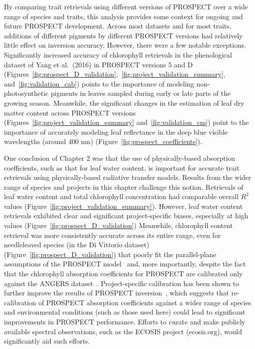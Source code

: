 By comparing trait retrievals using different versions of PROSPECT over a wide range of species and traits, this analysis provides some context for ongoing and future PROSPECT development.
Across most datasets and for most traits, additions of different pigments by different PROSPECT versions had relatively little effect on inversion accuracy.
However, there were a few notable exceptions.
Significantly increased accuracy of chlorophyll retrievals in the phenological dataset of Yang et al.~(2016) \nocite{yang_2016_seasonal} in PROSPECT versions 5 and D (Figures~\ref{fig:prospect_D_validation},~\ref{fig:project_validation_summary}, and~\ref{fig:validation_cab}) points to the importance of modeling non-photosynthetic pigments in leaves sampled during early or late parts of the growing season.
Meanwhile, the significant changes in the estimation of leaf dry matter content across PROSPECT versions (Figures~\ref{fig:project_validation_summary} and~\ref{fig:validation_cm}) point to the importance of accurately modeling leaf reflectance in the deep blue visible wavelengths (around 400 nm) (Figure~\ref{fig:prospect_coefficients}).

One conclusion of Chapter 2 was that the use of physically-based absorption coefficients, such as that for leaf water content, is important for accurate trait retrievals using physically-based radiative transfer models.
Results from the wider range of species and projects in this chapter challenge this notion.
Retrievals of leaf water content and total chlorophyll concentration had comparable overall $R^2$ values (Figure~\ref{fig:project_validation_summary}).
However, leaf water content retrievals exhibited clear and significant project-specific biases, especially at high values (Figure~\ref{fig:prospect_D_validation})
Meanwhile, chlorophyll content retrieval was more consistently accurate across its entire range, even for needleleaved species (in the Di Vittorio dataset) (Figure~\ref{fig:prospect_D_validation}) that poorly fit the parallel-plane assumptions of the PROSPECT model~\cite{allen_1969_interaction,jacquemoud1990_prospect} and, more importantly, despite the fact that the chlorophyll absorption coefficients for PROSPECT are calibrated only against the ANGERS dataset~\cite{feret2008_prospect,feret2017_prospectd}.
Project-specific calibration has been shown to further improve the results of PROSPECT inversion~\cite{li_2013_retrieval}, which suggests that re-calibration of PROSPECT absorption coefficients against a wider range of species and environmental conditions (such as those used here) could lead to significant improvements in PROSPECT performance.
Efforts to curate and make publicly available spectral observations, such as the ECOSIS project (ecosis.org), would significantly aid such efforts.
% 
% 

